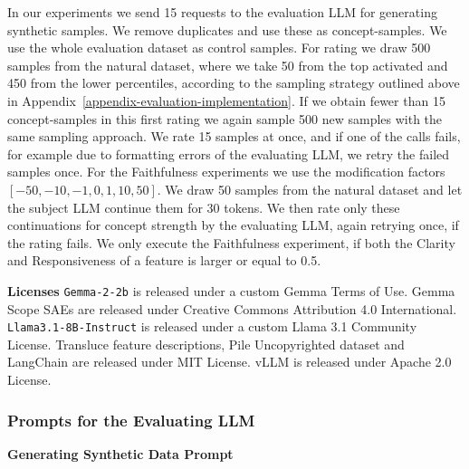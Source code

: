 In our experiments we send 15 requests to the evaluation LLM for generating synthetic samples. We remove duplicates and use these as concept-samples. We use the whole evaluation dataset as control samples. For rating we draw 500 samples from the natural dataset, where we take 50 from the top activated and 450 from the lower percentiles, according to the sampling strategy outlined above in Appendix~\ref{appendix-evaluation-implementation}. If we obtain fewer than 15 concept-samples in this first rating we again sample 500 new samples with the same sampling approach. We rate 15 samples at once, and if one of the calls fails, for example due to formatting errors of the evaluating LLM, we retry the failed samples once. 
For the Faithfulness experiments we use the modification factors $[-50, -10, -1, 0, 1, 10, 50]$. We draw 50 samples from the natural dataset and let the subject LLM continue them for 30 tokens. We then rate only these continuations for concept strength by the evaluating LLM, again retrying once, if the rating fails. We only execute the Faithfulness experiment, if both the Clarity and Responsiveness of a feature is larger or equal to 0.5. 

\textbf{Licenses} \texttt{Gemma-2-2b} is released under a custom Gemma Terms of Use. Gemma Scope SAEs are released under Creative Commons Attribution 4.0 International. \texttt{Llama3.1-8B-Instruct} is released under a custom Llama 3.1 Community License. Transluce feature descriptions, Pile Uncopyrighted dataset and LangChain are released under MIT License. vLLM is released under  Apache 2.0 License.


\subsubsection{Prompts for the Evaluating LLM}\label{appendix-evaluation-experiment-setup-prompts}

\textbf{Generating Synthetic Data Prompt}

